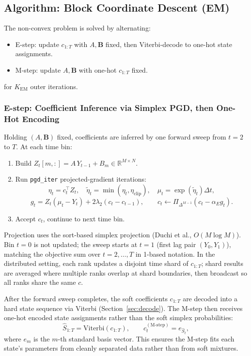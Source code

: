 \documentclass[11pt]{article}
\begin{document}
\subsection{Algorithm: Block Coordinate Descent (EM)}

The non-convex problem is solved by alternating:
\begin{itemize}
  \item E-step: update \(c_{1:T}\) with \(A,\mathbf{B}\) fixed, then Viterbi-decode to one-hot state assignments.
  \item M-step: update \(A,\mathbf{B}\) with one-hot \(c_{1:T}\) fixed.
\end{itemize}
for \(K_{\mathrm{EM}}\) outer iterations.

\subsubsection{E-step: Coefficient Inference via Simplex PGD, then One-Hot Encoding}

Holding \((A,\mathbf{B})\) fixed, coefficients are inferred by one forward
sweep from \(t=2\) to \(T\). At each time bin:
\begin{enumerate}
  \item Build \(Z_t[m,:] = A\,Y_{t-1}+B_m\in\mathbb{R}^{M\times N}\).
  \item Run \texttt{pgd\_iter} projected-gradient iterations:
  \[
    \eta_t = c_t^\top Z_t,\quad
    \tilde{\eta}_t = \min(\eta_t,\eta_{\mathrm{clip}}),\quad
    \mu_t = \exp(\tilde{\eta}_t)\Delta t,
  \]
  \[
    g_t = Z_t\left(\mu_t-Y_t\right) + 2\lambda_2(c_t-c_{t-1}),
    \qquad
    c_t \leftarrow \Pi_{\Delta^{M-1}}(c_t-\alpha_E g_t).
  \]
  \item Accept \(c_t\), continue to next time bin.
\end{enumerate}
Projection uses the sort-based simplex projection (Duchi et al., \(O(M\log M)\)).
Bin \(t=0\) is not updated; the sweep starts at \(t=1\) (first lag pair
\((Y_0,Y_1)\)), matching the objective sum over \(t=2,\dots,T\) in
1-based notation.
In the distributed setting, each rank updates a disjoint time shard of
\(c_{1:T}\); shard results are averaged where multiple ranks overlap at
shard boundaries, then broadcast so all ranks share the same \(c\).

After the forward sweep completes, the soft coefficients \(c_{1:T}\) are decoded into a hard state sequence via Viterbi (Section~\ref{sec:decode}). The M-step then receives one-hot encoded state assignments rather than the soft simplex probabilities:
\begin{equation}
  \hat{S}_{1:T} = \mathrm{Viterbi}(c_{1:T}), \qquad
  c_t^{\mathrm{(M\text{-}step)}} = e_{\hat{S}_t},
\end{equation}
where \(e_m\) is the \(m\)-th standard basis vector. This ensures the M-step fits each state's parameters from cleanly separated data rather than from soft mixtures.
\end{document}

